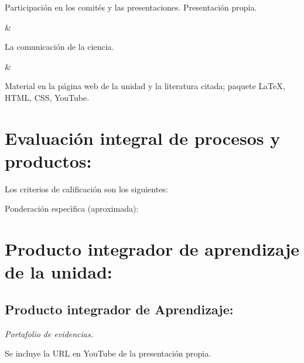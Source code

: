 Participaci\'{o}n en los comit\'{e}s y las
presentaciones. Presentaci\'{o}n propia.

&

La comunicaci\'{o}n de la ciencia.

&

Material en la p\'{a}gina web de la unidad y la literatura citada;
paquete {\LaTeX}, HTML, CSS, YouTube.



\section{Evaluaci\'{o}n integral de procesos y productos:}

Los criterios de calificaci\'{o}n son los siguientes:

  
Ponderaci\'{o}n espec\'{\i}fica (aproximada):

 

\newpage

\section{Producto integrador de aprendizaje de la unidad:}

\subsection{Producto integrador de Aprendizaje:}

{\em Portafolio de evidencias.}

Se incluye la URL en YouTube de la presentaci\'{o}n propia.


